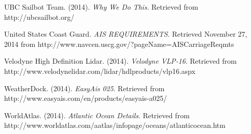 \begin{thebibliography}{99}
 UBC Sailbot Team. (2014). \textit{Why We Do This}. Retrieved from http://ubcsailbot.org/

 United States Coast Guard. \textit{AIS REQUIREMENTS}. Retrieved November 27, 2014 from http://www.navcen.uscg.gov/?pageName=AISCarriageReqmts

 Velodyne High Definition Lidar. (2014). \textit{Velodyne VLP-16}. Retrieved from http://www.velodynelidar.com/lidar/hdlproducts/vlp16.aspx

 WeatherDock. (2014). \textit{EasyAis 025}. Retrieved from http://www.easyais.com/en/products/easyais-a025/

 WorldAtlas. (2014). \textit{Atlantic Ocean Details}. Retrieved from http://www.worldatlas.com/aatlas/infopage/oceans/atlanticocean.htm

\end{thebibliography}
